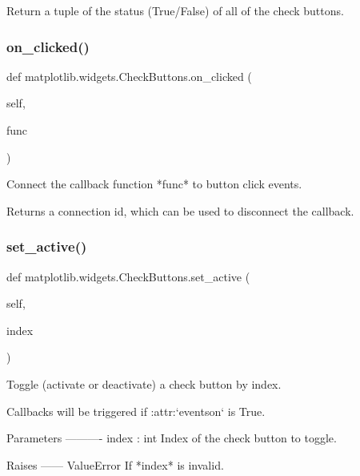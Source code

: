 \begin{DoxyVerb}Return a tuple of the status (True/False) of all of the check buttons.
\end{DoxyVerb}
 \mbox{\label{classmatplotlib_1_1widgets_1_1CheckButtons_a2521d9a8165bfbe0463537e8acc36b94}} 
\subsubsection{\texorpdfstring{on\+\_\+clicked()}{on\_clicked()}}
{\footnotesize\ttfamily def matplotlib.\+widgets.\+Check\+Buttons.\+on\+\_\+clicked (\begin{DoxyParamCaption}\item[{}]{self,  }\item[{}]{func }\end{DoxyParamCaption})}

\begin{DoxyVerb}Connect the callback function *func* to button click events.

Returns a connection id, which can be used to disconnect the callback.
\end{DoxyVerb}
 \mbox{\label{classmatplotlib_1_1widgets_1_1CheckButtons_a50ef24a39aa238582d6d492797ce42a6}} 
\subsubsection{\texorpdfstring{set\+\_\+active()}{set\_active()}}
{\footnotesize\ttfamily def matplotlib.\+widgets.\+Check\+Buttons.\+set\+\_\+active (\begin{DoxyParamCaption}\item[{}]{self,  }\item[{}]{index }\end{DoxyParamCaption})}

\begin{DoxyVerb}Toggle (activate or deactivate) a check button by index.

Callbacks will be triggered if :attr:`eventson` is True.

Parameters
----------
index : int
    Index of the check button to toggle.

Raises
------
ValueError
    If *index* is invalid.
\end{DoxyVerb}
 

